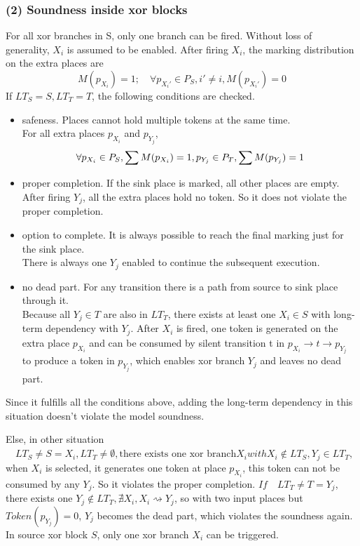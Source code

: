 \subsubsection{(2) Soundness inside xor blocks}
For all xor branches in S, only one branch can be fired. Without loss of generality, $X_i$ is assumed to be enabled. After firing $X_i$, the marking distribution on the extra places are  
\[ M(p_{X_i}) = 1; \quad 
\forall p_{X_i\prime} \in P_S, i\prime \neq i, M(p_{X_i\prime})=0 \]
If $ LT_S = S, LT_T=T$, the following conditions are checked. 
\begin{itemize}
	\item safeness. Places cannot hold multiple tokens at the same time.\\
	For all extra places $p_{X_i}$ and $p_{Y_j}$, 
	\[\forall p_{X_i} \in P_S, \sum M(p_{X_i})=1, \\
	p_{Y_j} \in P_T,  \sum M(p_{Y_j})=1 \] 
	\item proper completion. If the sink place is marked, all other places are empty. \\
	After firing $Y_j$, all the extra places hold no token. So it does not violate the proper completion.
	\item option to complete.  It is always possible to reach the final marking just for the sink place. \\
	There is always one $Y_j$ enabled to continue the subsequent execution.
	\item no dead part. For any transition there is a path from source to sink place through it. \\
	Because all $Y_j \in T$ are also in $LT_T$, there exists at least one $X_i\in S$ with long-term dependency with $Y_j$. After $X_i$ is fired, one token is generated on the extra place $p_{X_i}$ and can be consumed by silent transition t in  $p_{X_i} \rightarrow t \rightarrow p_{Y_{j}}$ to produce a token in $p_{Y_j}$, which enables xor branch $Y_j$ and leaves no dead part.
\end{itemize}
Since it fulfills all the conditions above, adding the long-term dependency in this situation doesn't violate the model soundness.

Else, in other situation $\quad LT_S \neq S={X_i}, LT_T \neq \emptyset, \text{there exists one xor branch} X_i with X_i \notin LT_S, Y_j \in LT_T, $ when $X_i$ is selected, it generates one token at place $p_{X_i}$, this token can not be consumed by any $Y_j$. So it violates the proper completion. 
$If \quad LT_T \neq T={Y_j}$, there exists one $Y_j \notin LT_T, \nexists X_i, X_i \rightsquigarrow Y_j$, so with two input places but $Token(p_{Y_j})=0$,  $Y_j$ becomes the dead part, which violates the soundness again.\\
In source xor block $S$, only one xor branch $X_i$  can be triggered.  

